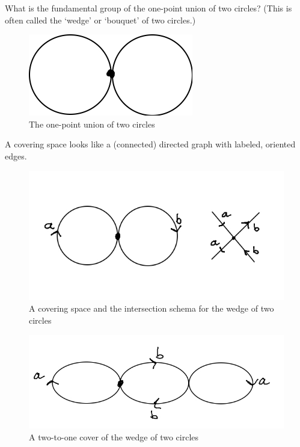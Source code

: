
What is the fundamental group of the one-point union of two circles? (This is often called the `wedge' or `bouquet' of two circles.)

\begin{figure}[!htb]
	\centering
	\includegraphics[scale=.5]{images/wedge2circ}
	\caption{The one-point union of two circles}
	\label{fig:wedge2circ}
\end{figure}


A covering space looks like a (connected) directed graph with labeled, oriented edges.

\begin{figure}[!htb]
	\centering
	\includegraphics[scale=.5]{images/wedge2circcov}
	\caption{A covering space and the intersection schema for the wedge of two circles}
	\label{fig:wedge2circcov}
\end{figure}


\begin{figure}[!htb]
	\centering
	\includegraphics[scale=.5]{images/wedge2circcov2-1}
	\caption{A two-to-one cover of the wedge of two circles}
	\label{fig:wedge2circcov2-1}
\end{figure}



